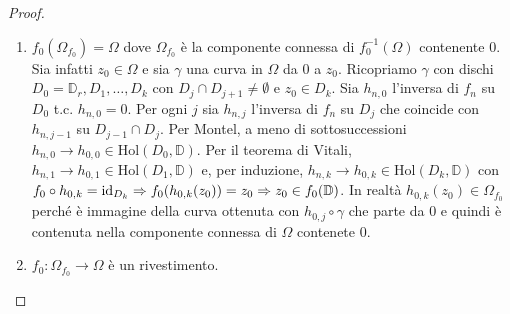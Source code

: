 \begin{proof}
\begin{enumerate}
    \item $f_0(\Omega_{f_0})=\Omega$ dove $\Omega_{f_0}$ è la componente connessa di $f_0^{-1}(\Omega)$ contenente $0$. Sia infatti $z_0 \in \Omega$ e sia $\gamma$ una curva in $\Omega$ da $0$ a $z_0$.
    Ricopriamo $\gamma$ con dischi $D_0=\mathbb{D}_r, D_1, \dots, D_k$ con $D_j \cap D_{j+1} \not=\emptyset$ e $z_0 \in D_k$. Sia $h_{n, 0}$ l'inversa di $f_n$ su $D_0$ t.c. $h_{n,0}=0$.
    Per ogni $j$ sia $h_{n, j}$ l'inversa di $f_n$ su $D_j$ che coincide con $h_{n, j-1}$ su $D_{j-1} \cap D_j$. Per Montel, a meno di sottosuccessioni $h_{n, 0} \longrightarrow h_{0, 0} \in \text{Hol}(D_0, \mathbb{D})$.
    Per il teorema di Vitali, $h_{n, 1} \longrightarrow h_{0, 1} \in \text{Hol}(D_1, \mathbb{D})$ e, per induzione, $h_{n, k} \longrightarrow h_{0, k} \in \text{Hol}(D_k, \mathbb{D})$ con $f_0 \circ h_{0, k}=\operatorname{id}_{D_k} \Rightarrow f_0(h_{0, k}(z_0))=z_0 \Rightarrow z_0 \in f_0(\mathbb{D})$.
    In realtà $h_{0, k}(z_0) \in \Omega_{f_0}$ perché è immagine della curva ottenuta con $h_{0, j} \circ \gamma$ che parte da $0$ e quindi è contenuta nella componente connessa di $\Omega$ contenete $0$.
    \item $f_0:\Omega_{f_0} \longrightarrow \Omega$ è un rivestimento.
  \end{enumerate}
\end{proof}
